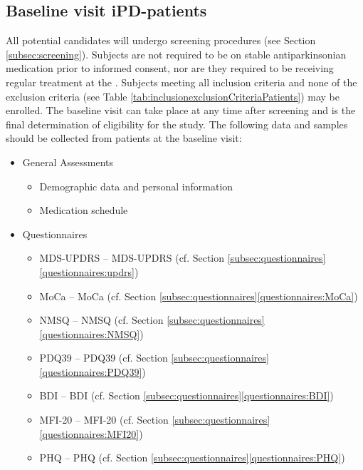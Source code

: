 \subsection{Baseline visit \ac{iPD}-patients}
All potential candidates will undergo screening procedures (see Section \ref{subsec:screening}). Subjects are not required to be on stable antiparkinsonian medication prior to informed consent, nor are they required to be receiving regular treatment at the \UKM{}. Subjects meeting all inclusion criteria and none of the exclusion criteria (see Table \ref{tab:inclusionexclusionCriteriaPatients}) may be enrolled. The baseline visit can take place at any time after screening and is the final determination of eligibility for the study. The following data and samples should be collected from patients at the baseline visit:
\begin{itemize}[noitemsep,topsep=0pt]
\item General Assessments
\begin{itemize}[noitemsep,topsep=0pt]
\item Demographic data and personal information
\item Medication schedule
\end{itemize}
\item Questionnaires
\begin{itemize}[noitemsep,topsep=0pt]
\item \acl{MDS-UPDRS} -- \acs{MDS-UPDRS} (cf. Section \ref{subsec:questionnaires}\ref{questionnaires:updrs})
\item \acl{MoCa} -- \acs{MoCa} (cf. Section \ref{subsec:questionnaires}\ref{questionnaires:MoCa})
\item \acl{NMSQ} -- \acs{NMSQ} (cf. Section \ref{subsec:questionnaires}\ref{questionnaires:NMSQ})
\item \acl{PDQ39} -- \acs{PDQ39} (cf. Section \ref{subsec:questionnaires}\ref{questionnaires:PDQ39})
\item \acl{BDI} -- \acs{BDI} (cf. Section \ref{subsec:questionnaires}\ref{questionnaires:BDI})
\item \acl{MFI-20} -- \acs{MFI-20} (cf. Section \ref{subsec:questionnaires}\ref{questionnaires:MFI20})
\item \acl{PHQ} -- \acs{PHQ} (cf. Section \ref{subsec:questionnaires}\ref{questionnaires:PHQ})

\end{itemize}
\end{itemize}
